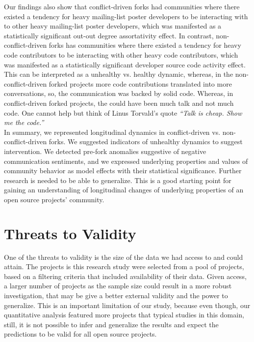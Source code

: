 \documentclass[12pt]{report}
\begin{document}
Our findings also show that conflict-driven forks had communities where there existed a tendency for heavy mailing-list poster developers to be interacting with to other heavy mailing-list poster developers, which was manifested as a statistically significant out-out degree assortativity effect. In contrast, non-conflict-driven forks has communities where there existed a tendency for heavy code contributors to be interacting with other heavy code contributors, which was manifested as a statistically significant developer source code activity effect. This can be interpreted as a unhealthy vs. healthy dynamic, whereas, in the non-conflict-driven forked projects more code contributions translated into more conversations, so, the communication was backed by solid code. Whereas, in conflict-driven forked projects, the could have been much talk and not much code. One cannot help but think of Linus Torvald's quote \textit{``Talk is cheap. Show me the code.''}\\

In summary, we represented longitudinal dynamics in conflict-driven vs. non-conflict-driven forks. We suggested indicators of unhealthy dynamics to suggest intervention. We detected pre-fork anomalies suggestive of negative communication sentiments, and we expressed underlying properties and values of community behavior as model effects with their statistical significance. Further research is needed to be able to generalize. This is a good starting point for gaining an understanding of longitudinal changes of underlying properties of an open source projects' community.\\




\pagebreak

\section{Threats to Validity}
\label{threatsToValidity}

One of the threats to validity is the size of the data we had access to and could attain. The projects is this research study were selected from a pool of projects, based on a filtering criteria that included availability of their data. Given access, a larger number of projects as the sample size could result in a more robust investigation, that may be give a better external validity and the power to generalize. This is an important limitation of our study, because even though, our quantitative analysis featured more projects that typical studies in this domain, still, it is not possible to infer and generalize the results and expect the predictions to be valid for all open source projects. 
\end{document}
